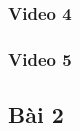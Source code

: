 \documentclass{article}
\begin{document}
\subsubsection{Video 4}

\subsubsection{Video 5}

\subsection{Bài 2}


\end{document}
